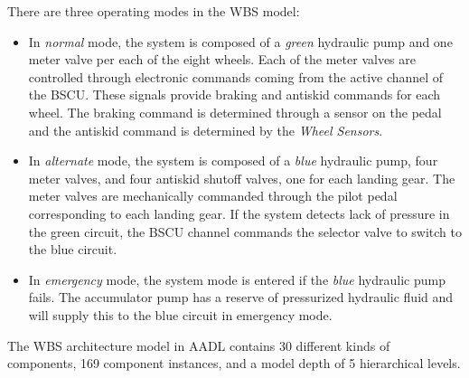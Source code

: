 There are three operating modes in the WBS model:

\begin{itemize}
	\renewcommand{\labelitemi}{\textbullet}
	\item In \textit{normal} mode, the system is composed of a \textit{green} hydraulic pump and one meter valve per each of the eight wheels. Each of the meter valves are controlled through electronic commands coming from the active channel of the BSCU. These signals provide braking and antiskid commands for each wheel. The braking command is determined through a sensor on the pedal and the antiskid command is determined by the \textit{Wheel Sensors}. 
	\item In \textit{alternate} mode, the system is composed of a \textit{blue} hydraulic pump, four meter valves, and four antiskid shutoff valves, one for each landing gear. The meter valves are mechanically commanded through the pilot pedal corresponding to each landing gear. If the system detects lack of pressure in the green circuit, the BSCU channel commands the selector valve to switch to the blue circuit. 
	\item In \textit{emergency} mode, the system mode is entered if the \textit{blue} hydraulic pump fails. The accumulator pump has a reserve of pressurized hydraulic fluid and will supply this to the blue circuit in emergency mode. 
\end{itemize}

The WBS architecture model in AADL contains 30 different kinds of components, 169 component instances, and a model depth of 5 hierarchical levels. 




